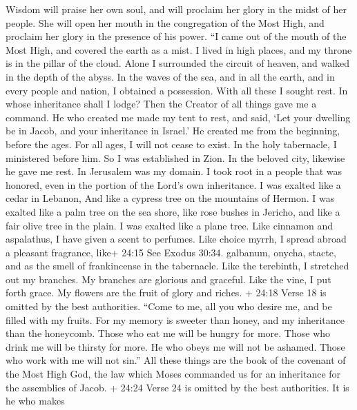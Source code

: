  Wisdom will praise her own soul, and will proclaim her
glory in the midst of her people.  She will open her mouth
in the congregation of the Most High, and proclaim her glory in the
presence of his power.  ``I came out of the mouth of the
Most High, and covered the earth as a mist.  I lived in high
places, and my throne is in the pillar of the cloud.  Alone
I surrounded the circuit of heaven, and walked in the depth of the
abyss.  In the waves of the sea, and in all the earth, and
in every people and nation, I obtained a possession.  With
all these I sought rest. In whose inheritance shall I lodge?
 Then the Creator of all things gave me a command. He who
created me made my tent to rest, and said, `Let your dwelling be in
Jacob, and your inheritance in Israel.'  He created me from
the beginning, before the ages. For all ages, I will not cease to exist.
 In the holy tabernacle, I ministered before him. So I was
established in Zion.  In the beloved city, likewise he gave
me rest. In Jerusalem was my domain.  I took root in a
people that was honored, even in the portion of the Lord's own
inheritance.  I was exalted like a cedar in Lebanon, And
like a cypress tree on the mountains of Hermon.  I was
exalted like a palm tree on the sea shore, like rose bushes in Jericho,
and like a fair olive tree in the plain. I was exalted like a plane
tree.  Like cinnamon and aspalathus, I have given a scent
to perfumes. Like choice myrrh, I spread abroad a pleasant fragrance,
like+ 24:15 See Exodus 30:34. galbanum, onycha, stacte, and as the smell
of frankincense in the tabernacle.  Like the terebinth, I
stretched out my branches. My branches are glorious and graceful.
 Like the vine, I put forth grace. My flowers are the fruit
of glory and riches.  + 24:18 Verse 18 is omitted by the
best authorities.  ``Come to me, all you who desire me, and
be filled with my fruits.  For my memory is sweeter than
honey, and my inheritance than the honeycomb.  Those who
eat me will be hungry for more. Those who drink me will be thirsty for
more.  He who obeys me will not be ashamed. Those who work
with me will not sin.''  All these things are the book of
the covenant of the Most High God, the law which Moses commanded us for
an inheritance for the assemblies of Jacob.  + 24:24 Verse
24 is omitted by the best authorities.  It is he who makes
